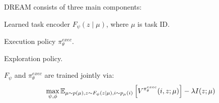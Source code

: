 \documentclass[11pt]{article}
\begin{document}


DREAM consists of three main components:
\begin{compactenum}
	\item Learned task encoder $F_{\psi}(z \mid \mu)$, where $\mu$ is task ID.
	\item Execution policy $\pi_{\theta}^{exec}$.
	\item Exploration policy. 
\end{compactenum}

$F_{\psi}$ and $\pi_{\theta}^{exec}$ are trained jointly via:
\begin{align}
	\max_{\psi, \phi} \E[\mu \sim p(\mu), z \sim F_{\psi}(z \mid \mu), i \sim p_{\mu}(i)]{
		V^{\pi_{\theta}^{exec}} (i, z ; \mu)
	} - \lambda I(z; \mu)
\end{align}
\end{document}
